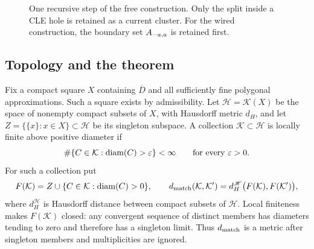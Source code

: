 \begin{figure}[!htbp]
\centering
{}
\caption{One recursive step of the free construction. Only the split
inside a CLE hole is retained as a current cluster. For the wired
construction, the boundary set \(A_{-a,a}\) is retained first.}
\label{fig:free-procedure}
\end{figure}

\subsection{Topology and the theorem}
Fix a compact square \(X\) containing \(\overline D\) and all sufficiently
fine polygonal approximations. Such a square exists by admissibility.
Let \(\mathscr H=\mathcal K(X)\) be the space of nonempty compact subsets
of \(X\), with Hausdorff metric \(d_H\), and let
\(Z=\{\{x\}:x\in X\}\subset\mathscr H\) be its singleton subspace.
A collection \(\mathcal K\subset\mathscr H\) is locally finite above
positive diameter if
\[
 \#\{C\in\mathcal K:\operatorname{diam}(C)>\varepsilon\}<\infty
 \qquad\text{for every \(\varepsilon>0\)}.
\]
For such a collection put
\[
 F(\mathcal K)=Z\cup\{C\in\mathcal K:\operatorname{diam}(C)>0\},\qquad
 d_{\rm match}(\mathcal K,\mathcal K')
   =d_H^{\mathscr H}\bigl(F(\mathcal K),F(\mathcal K')\bigr),
\]
where \(d_H^{\mathscr H}\) is Hausdorff distance between compact subsets
of \(\mathscr H\). Local finiteness makes \(F(\mathcal K)\) closed:
any convergent sequence of distinct members has diameters tending to
zero and therefore has a singleton limit. Thus \(d_{\rm match}\) is a
metric after singleton members and multiplicities are ignored.

